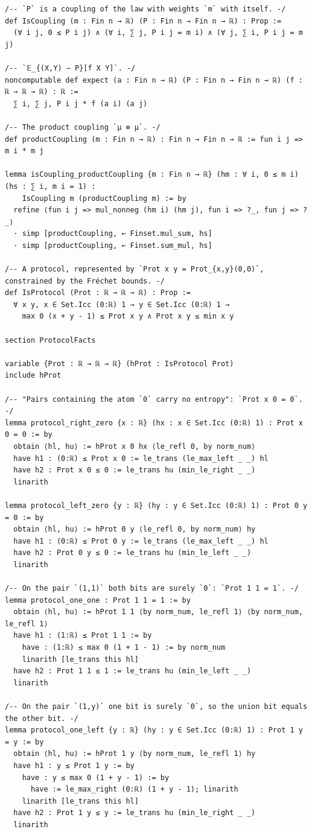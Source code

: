 \documentclass[11pt,a4paper]{article}
\theoremstyle{definition}
\theoremstyle{remark}
\begin{document}
\begin{Verbatim}[fontsize=\scriptsize,formatcom=\leanmono,samepage=false]
/-- `P` is a coupling of the law with weights `m` with itself. -/
def IsCoupling (m : Fin n → ℝ) (P : Fin n → Fin n → ℝ) : Prop :=
  (∀ i j, 0 ≤ P i j) ∧ (∀ i, ∑ j, P i j = m i) ∧ (∀ j, ∑ i, P i j = m j)

/-- `𝔼_{(X,Y) ∼ P}[f X Y]`. -/
noncomputable def expect (a : Fin n → ℝ) (P : Fin n → Fin n → ℝ) (f : ℝ → ℝ → ℝ) : ℝ :=
  ∑ i, ∑ j, P i j * f (a i) (a j)

/-- The product coupling `μ ⊗ μ`. -/
def productCoupling (m : Fin n → ℝ) : Fin n → Fin n → ℝ := fun i j => m i * m j

lemma isCoupling_productCoupling {m : Fin n → ℝ} (hm : ∀ i, 0 ≤ m i) (hs : ∑ i, m i = 1) :
    IsCoupling m (productCoupling m) := by
  refine ⟨fun i j => mul_nonneg (hm i) (hm j), fun i => ?_, fun j => ?_⟩
  · simp [productCoupling, ← Finset.mul_sum, hs]
  · simp [productCoupling, ← Finset.sum_mul, hs]

/-- A protocol, represented by `Prot x y = Prot_{x,y}(0,0)`, constrained by the Fréchet bounds. -/
def IsProtocol (Prot : ℝ → ℝ → ℝ) : Prop :=
  ∀ x y, x ∈ Set.Icc (0:ℝ) 1 → y ∈ Set.Icc (0:ℝ) 1 →
    max 0 (x + y - 1) ≤ Prot x y ∧ Prot x y ≤ min x y

section ProtocolFacts

variable {Prot : ℝ → ℝ → ℝ} (hProt : IsProtocol Prot)
include hProt

/-- "Pairs containing the atom `0` carry no entropy": `Prot x 0 = 0`. -/
lemma protocol_right_zero {x : ℝ} (hx : x ∈ Set.Icc (0:ℝ) 1) : Prot x 0 = 0 := by
  obtain ⟨hl, hu⟩ := hProt x 0 hx ⟨le_refl 0, by norm_num⟩
  have h1 : (0:ℝ) ≤ Prot x 0 := le_trans (le_max_left _ _) hl
  have h2 : Prot x 0 ≤ 0 := le_trans hu (min_le_right _ _)
  linarith

lemma protocol_left_zero {y : ℝ} (hy : y ∈ Set.Icc (0:ℝ) 1) : Prot 0 y = 0 := by
  obtain ⟨hl, hu⟩ := hProt 0 y ⟨le_refl 0, by norm_num⟩ hy
  have h1 : (0:ℝ) ≤ Prot 0 y := le_trans (le_max_left _ _) hl
  have h2 : Prot 0 y ≤ 0 := le_trans hu (min_le_left _ _)
  linarith

/-- On the pair `(1,1)` both bits are surely `0`: `Prot 1 1 = 1`. -/
lemma protocol_one_one : Prot 1 1 = 1 := by
  obtain ⟨hl, hu⟩ := hProt 1 1 ⟨by norm_num, le_refl 1⟩ ⟨by norm_num, le_refl 1⟩
  have h1 : (1:ℝ) ≤ Prot 1 1 := by
    have : (1:ℝ) ≤ max 0 (1 + 1 - 1) := by norm_num
    linarith [le_trans this hl]
  have h2 : Prot 1 1 ≤ 1 := le_trans hu (min_le_left _ _)
  linarith

/-- On the pair `(1,y)` one bit is surely `0`, so the union bit equals the other bit. -/
lemma protocol_one_left {y : ℝ} (hy : y ∈ Set.Icc (0:ℝ) 1) : Prot 1 y = y := by
  obtain ⟨hl, hu⟩ := hProt 1 y ⟨by norm_num, le_refl 1⟩ hy
  have h1 : y ≤ Prot 1 y := by
    have : y ≤ max 0 (1 + y - 1) := by
      have := le_max_right (0:ℝ) (1 + y - 1); linarith
    linarith [le_trans this hl]
  have h2 : Prot 1 y ≤ y := le_trans hu (min_le_right _ _)
  linarith


\end{Verbatim}
\end{document}
